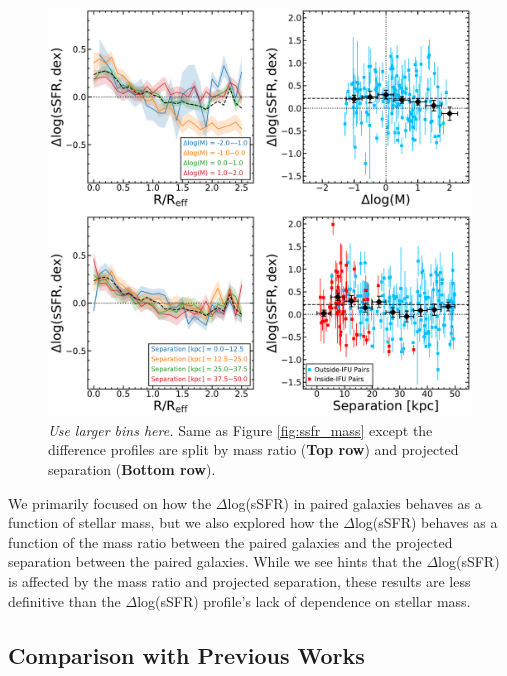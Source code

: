 \documentclass[iop,revtex4,twocolumn,apj,numberedappendix,appendixfloats]{emulateapj}
\begin{document}
\begin{figure}
\centering
\includegraphics[width=\linewidth]{fig/ssfr_partial.pdf}
\caption[]{{\it Use larger bins here.} Same as Figure \ref{fig:ssfr_mass} except the difference profiles are split by mass ratio (\textbf{Top row}) and projected separation (\textbf{Bottom row}). }
\label{fig:ssfr_dmsep}
\end{figure}

We primarily focused on how the $\Delta$log(sSFR) in paired galaxies behaves as a function of stellar mass, but we also explored how the $\Delta$log(sSFR) behaves as a function of the mass ratio between the paired galaxies and the projected separation between the paired galaxies. While we see hints that the $\Delta$log(sSFR) is affected by the mass ratio and projected separation, these results are less definitive than the $\Delta$log(sSFR) profile's lack of dependence on stellar mass. 

\subsection{Comparison with Previous Works}
\end{document}
